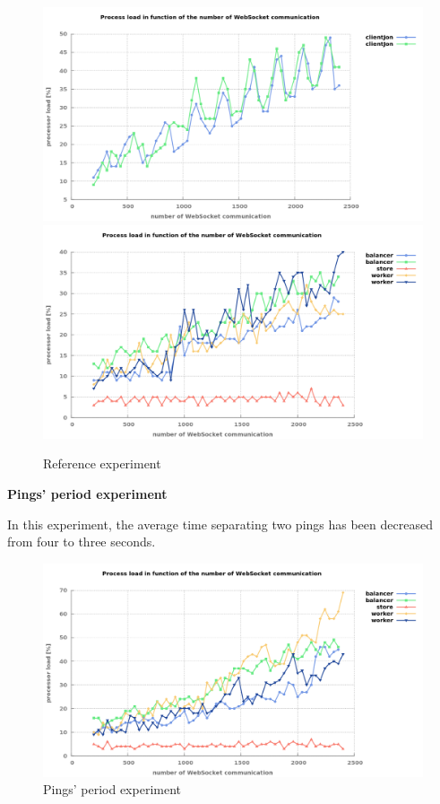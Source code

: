 \begin{figure}[H]
	\centering
		\includegraphics[width=\textwidth]{./Figures/base_client_influence.png}
		\includegraphics[width=\textwidth]{./Figures/base_server_influence.png}
	\caption[Reference experiment]{Reference experiment}
	\label{fig:base_influence}
\end{figure}

\newpage

\textbf{Pings' period experiment}

In this experiment, the average time separating two pings has been decreased
from four to three seconds.

\begin{figure}[H]
	\centering
		\includegraphics[width=.9\textwidth]{./Figures/ping_server_influence.png}
	\caption[Pings' period experiment]{Pings' period experiment}
	\label{fig:ping_server_influence}
\end{figure}

